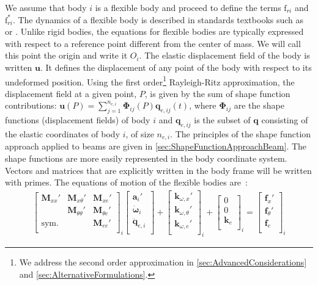 \documentclass[wes, manuscript]{copernicus}
\renewcommand{\v}[1]{\boldsymbol{#1}}
\newcommand{\m}[1]{\boldsymbol{#1}}
\newcommand{\M} {{\m{M}}}
\newcommand{\kanef}{\mathrm{f}}
\begin{document}
We assume that body $i$ is a flexible body and proceed to define the terms $\kanef_{ri}$ and $\kanef_{ri}^*$.
The dynamics of a flexible body is described in standards textbooks 
such as \cite{shabana:book} or \cite{Schwertassek:book}.
Unlike rigid bodies, the equations for flexible bodies are typically expressed with respect to a reference point different from the center of mass.
We will call this point the origin and write it $O_i$.
The elastic displacement field of the body is written $\v{u}$.
It defines the displacement of any point of the body with respect to its undeformed position.
Using the first order\footnote{We address the second order approximation in \autoref{sec:AdvancedConsiderations} and \autoref{sec:AlternativeFormulations}.} Rayleigh-Ritz approximation, the displacement field at a given point, $P$, is given by the sum of shape function contributions: $\v{u}(P)=\sum_{j=1}^{n_{e,i}} \v{\Phi}_{ij}(P) \v{q}_{e,ij}(t)$, where $\m{\Phi}_{ij}$ are the shape functions (displacement fields) of body $i$ and $\v{q}_{e,ij}$ is the subset of $\v{q}$ consisting of the elastic coordinates of body $i$, of size $n_{e,i}$.
The principles of the shape function approach applied to beams are given in \autoref{sec:ShapeFunctionApproachBeam}.
The shape functions are more easily represented in the body coordinate system.  
Vectors and matrices that are explicitly written in the body frame will be written with primes.
The equations of motion of the flexible bodies are~\citep{Wallrapp:1994}:
\begin{align}
    \begin{bmatrix}
       \M_{xx}'    & \M_{x \theta}' & \M_{ x e }' \\
                   & \M_{\theta \theta}'   & \M_{\theta e}'   \\
       \text{sym.} &            & \M_{e e}'  \\
    \end{bmatrix}_i
    \begin{bmatrix}
      \v{a}_i' \\
      \v{\dot{\omega}}_i \\
      \v{\ddot{q}}_{e,i} \\
    \end{bmatrix}
      +
    \begin{bmatrix}
      \v{k}_{\omega, x}' \\
      \v{k}_{\omega, \theta}' \\
      \v{k}_{\omega, e}' \\
    \end{bmatrix}_i
      +
    \begin{bmatrix}
      0 \\
      0 \\
      \v{k}_{e}\\
    \end{bmatrix}_i
      =
    \begin{bmatrix}
      \v{f}_{x}' \\
      \v{f}_{\theta}' \\
      \v{f}_{e}\\
    \end{bmatrix}_i
    \label{eq:EOMFlexibleBody}
\end{align}
\end{document}
